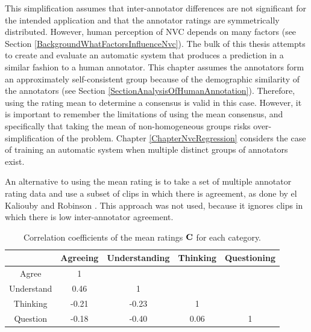 This simplification assumes that inter-annotator differences are not significant for the intended application and that the annotator ratings are symmetrically distributed. However, human perception of \ac{NVC} depends on many factors (see Section \ref{BackgroundWhatFactorsInfluenceNvc}). The bulk of this thesis attempts to create and evaluate an automatic system that produces a prediction in a similar fashion to a human annotator. This chapter assumes the annotators form an approximately self-consistent group because of the demographic similarity of the annotators (see Section \ref{SectionAnalysisOfHumanAnnotation}).
Therefore, using the rating mean to determine a consensus is valid in this case. However, it is important to remember the limitations of using the mean consensus, and specifically that taking the mean of non-homogeneous groups risks over-simplification of the problem. Chapter \ref{ChapterNvcRegression} considers the case of training an automatic system when multiple distinct groups of annotators exist.

An alternative to using the mean rating is to take a set of multiple annotator rating data and use a subset of clips in which there is agreement, as done by el Kaliouby and Robinson \cite{ElKaliouby2004}. This approach was not used, because it ignores clips in which there is low inter-annotator agreement.

\begin{table}[tb]
\centering
\begin{tabular}{ | c || c | c | c | c | }
\hline
& Agreeing & Understanding & Thinking & Questioning \\
\hline
\hline
Agree & 1 & & &\\
Understand & 0.46 & 1 & &\\
Thinking & -0.21 & -0.23 & 1 &\\
Question & -0.18 & -0.40 & 0.06 & 1 \\
\hline  
\end{tabular}
\caption{Correlation coefficients of the mean ratings $\textbf{C}$ for each category.}
\label{CorrelationOfCategoriesTable}
\end{table}

